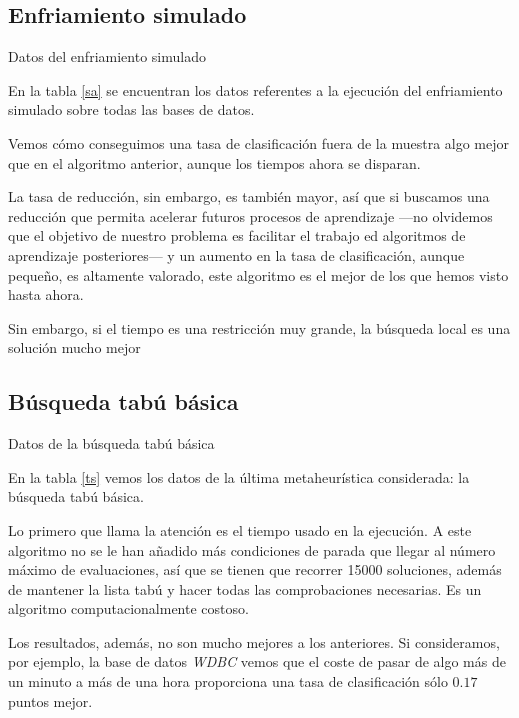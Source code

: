\documentclass[a4paper, 11pt, titlepage]{article}
\begin{document}
    \subsection{Enfriamiento simulado}
    \begin{table}[!htb]
        \maketable{\dataSA}
        \caption{Datos del enfriamiento simulado}
        \label{sa}
    \end{table}

    En la tabla \ref{sa} se encuentran los datos referentes a la ejecución del enfriamiento simulado sobre todas las bases de datos.

    Vemos cómo conseguimos una tasa de clasificación fuera de la muestra algo mejor que en el algoritmo anterior, aunque los tiempos ahora se disparan.

    La tasa de reducción, sin embargo, es también mayor, así que si buscamos una reducción que permita acelerar futuros procesos de aprendizaje ---no olvidemos que el objetivo de nuestro problema es facilitar el trabajo ed algoritmos de aprendizaje posteriores--- y un aumento en la tasa de clasificación, aunque pequeño, es altamente valorado, este algoritmo es el mejor de los que hemos visto hasta ahora.

    Sin embargo, si el tiempo es una restricción muy grande, la búsqueda local es una solución mucho mejor

    \subsection{Búsqueda tabú básica}
    \begin{table}[!htb]
        \maketable{\dataTS}
        \caption{Datos de la búsqueda tabú básica}
        \label{ts}
    \end{table}

    En la tabla \ref{ts} vemos los datos de la última metaheurística considerada: la búsqueda tabú básica.

    Lo primero que llama la atención es el tiempo usado en la ejecución. A este algoritmo no se le han añadido más condiciones de parada que llegar al número máximo de evaluaciones, así que se tienen que recorrer 15000 soluciones, además de mantener la lista tabú y hacer todas las comprobaciones necesarias. Es un algoritmo computacionalmente costoso.

    Los resultados, además, no son mucho mejores a los anteriores. Si consideramos, por ejemplo, la base de datos \emph{WDBC} vemos que el coste de pasar de algo más de un minuto a más de una hora proporciona una tasa de clasificación sólo $0.17$ puntos mejor.
\end{document}
